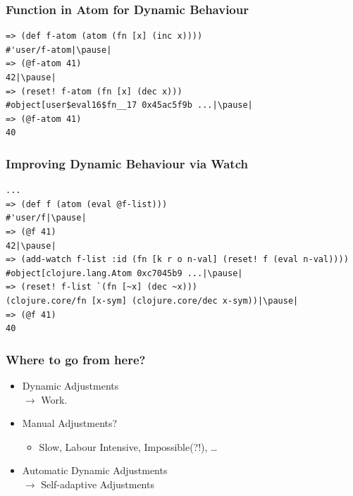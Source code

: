 \documentclass[aspectratio=169]{beamer}
\begin{document}
\begin{frame}[fragile]
\frametitle{Function in Atom for Dynamic Behaviour}
\begin{lstlisting}[]
=> (def f-atom (atom (fn [x] (inc x))))
#'user/f-atom|\pause|
=> (@f-atom 41)                        
42|\pause|
=> (reset! f-atom (fn [x] (dec x)))
#object[user$eval16$fn__17 0x45ac5f9b ...|\pause|
=> (@f-atom 41)                    
40
\end{lstlisting}
\end{frame}



\begin{frame}[fragile]
\frametitle{Improving Dynamic Behaviour via Watch}
\begin{lstlisting}[caption=Improving Dynamic Behaviour via Watch]
...
=> (def f (atom (eval @f-list)))                            
#'user/f|\pause|
=> (@f 41)                                
42|\pause|
=> (add-watch f-list :id (fn [k r o n-val] (reset! f (eval n-val))))
#object[clojure.lang.Atom 0xc7045b9 ...|\pause|
=> (reset! f-list `(fn [~x] (dec ~x)))                      
(clojure.core/fn [x-sym] (clojure.core/dec x-sym))|\pause|
=> (@f 41)                                                  
40
\end{lstlisting}
\end{frame}



  \begin{frame}
    \frametitle{Where to go from here?}
    \begin{itemize}
        \item Dynamic Adjustments\\
              $\rightarrow$ Work.
        \item Manual Adjustments?
            \begin{itemize}
                \item Slow, Labour Intensive, Impossible(?!), \ldots{}
            \end{itemize}
        \item Automatic Dynamic Adjustments\\
              $\rightarrow$ Self-adaptive Adjustments
    \end{itemize}
  \end{frame}
\end{document}
